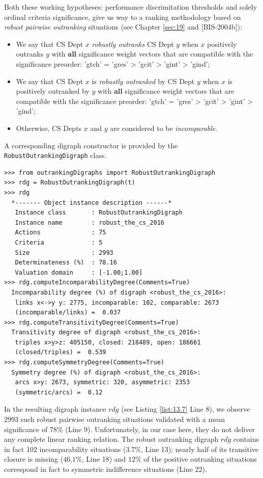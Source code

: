 Both these working hypotheses: performance discrimitation thresholds and solely ordinal criteria significance, give us way to a ranking methodology based on \emph{robust pairwise outranking} situations (see Chapter \ref{sec:19} and [BIS-2004b]):
\begin{itemize}
\item We say that CS Dept $x$ \emph{robustly outranks} CS Dept $y$ when $x$ positively outranks $y$ with \textbf{all} significance weight vectors that are compatible with the significance preorder: 'gtch' = 'gres' > 'gcit' > 'gint' > 'gind';
\item We say that CS Dept $x$ is \emph{robustly outranked} by CS Dept $y$ when $x$ is positively outranked by $y$ with \textbf{all} significance weight vectors that are compatible with the significance preorder: 'gtch' = 'gres' > 'gcit' > 'gint' > 'gind';
\item Otherwise, CS Depts $x$ and $y$ are considered to be \emph{incomparable}.
\end{itemize}

A corresponding digraph constructor is provided by the \texttt{RobustOutrankingDigraph} class.

\begin{lstlisting}[caption={Computing the robust outranking digraph},label=list:13.7]
>>> from outrankingDigraphs import RobustOutrankingDigraph		     
>>> rdg = RobustOutrankingDigraph(t)
>>> rdg
  *------- Object instance description ------*
   Instance class       : RobustOutrankingDigraph
   Instance name        : robust_the_cs_2016
   Actions              : 75
   Criteria             : 5
   Size                 : 2993
   Determinateness (%)  : 78.16
   Valuation domain     : [-1.00;1.00]
>>> rdg.computeIncomparabilityDegree(Comments=True)
  Incomparability degree (%) of digraph <robust_the_cs_2016>:
   links x<->y y: 2775, incomparable: 102, comparable: 2673
   (incomparable/links) =  0.037
>>> rdg.computeTransitivityDegree(Comments=True)
  Transitivity degree of digraph <robust_the_cs_2016>:
   triples x>y>z: 405150, closed: 218489, open: 186661
   (closed/triples) =  0.539
>>> rdg.computeSymmetryDegree(Comments=True)
  Symmetry degree (%) of digraph <robust_the_cs_2016>:
   arcs x>y: 2673, symmetric: 320, asymmetric: 2353
   (symmetric/arcs) =  0.12
\end{lstlisting}

In the resulting digraph instance $rdg$ (see Listing \ref{list:13.7} Line 8), we observe 2993 such robust pairwise outranking situations validated with a mean significance of $78\%$ (Line 9). Unfortunately, in our case here, they do not deliver any complete linear ranking relation. The robust outranking digraph $rdg$ contains in fact 102 incomparability situations ($3.7\%$, Line 13); nearly half of its transitive closure is missing ($46.1\%$, Line 18) and $12\%$ of the positive outranking situations correspond in fact to symmetric indifference situations (Line 22).

